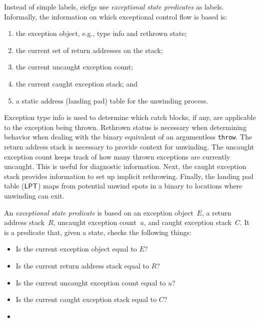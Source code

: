 Instead of simple labels, \acp{eicfg} use \emph{exceptional state predicates} as labels.
Informally, the information on which exceptional control flow is based is:
\begin{enumerate}
  \item the exception object, e.g., type info and rethrown state;
  \item the current set of return addresses on the stack;
  \item the current uncaught exception count;
  \item the current caught exception stack; and
  \item a static address (landing pad) table for the unwinding process.
\end{enumerate}
Exception type info is used to determine which catch blocks, if any, are applicable to the exception being thrown.
Rethrown status is necessary when determining behavior when dealing with the binary equivalent of an argumentless \lstinline{throw}.
The return address stack is necessary to provide context for unwinding.
The uncaught exception count keeps track of how many thrown exceptions are currently uncaught.
This is useful for diagnostic information.
Next, the caught exception stack provides information to set up implicit rethrowing.
Finally, the landing pad table ($\operatorname{\mathsf{LPT}}$) maps from potential unwind spots in a binary to locations where unwinding can exit.

\begin{definition}
  An \emph{exceptional state predicate} is based on an exception object~$E$, a return address stack~$R$, uncaught exception count~$u$, and caught exception stack~$C$.
  It is a predicate that, given a state, checks the following things:
  \begin{itemize}
    \item Is the current exception object equal to $E$?
    \item Is the current return address stack equal to $R$?
    \item Is the current uncaught exception count equal to $u$?
    \item Is the current caught exception stack equal to $C$?
    \item {}
  \end{itemize}
\end{definition}

